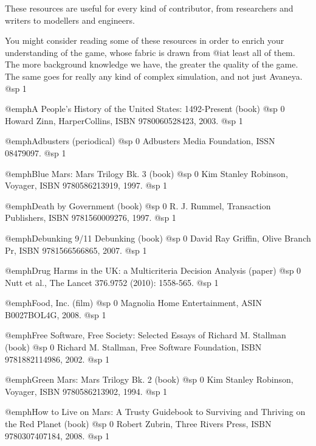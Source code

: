 These resources are useful for every kind of contributor, from researchers and writers to modellers and engineers.

You might consider reading some of these resources in order to enrich your understanding of the game, whose fabric is drawn from @i{at least} all of them. The more background knowledge we have, the greater the quality of the game. The same goes for really any kind of complex simulation, and not just Avaneya.
@sp 1

\itemize

\item
@emph{A People's History of the United States: 1492-Present} (book)
@sp 0
Howard Zinn, HarperCollins, ISBN 9780060528423, 2003.
@sp 1

\item
@emph{Adbusters} (periodical)
@sp 0
Adbusters Media Foundation, ISSN 08479097.
@sp 1

\item
@emph{Blue Mars: Mars Trilogy Bk. 3} (book)
@sp 0
Kim Stanley Robinson, Voyager, ISBN 9780586213919, 1997.
@sp 1

\item
@emph{Death by Government} (book)
@sp 0
R. J. Rummel, Transaction Publishers, ISBN 9781560009276, 1997.
@sp 1

\item
@emph{Debunking 9/11 Debunking} (book)
@sp 0
David Ray Griffin, Olive Branch Pr, ISBN 9781566566865, 2007.
@sp 1

\item
@emph{Drug Harms in the UK: a Multicriteria Decision Analysis} (paper)
@sp 0
Nutt et al., The Lancet 376.9752 (2010): 1558-565.
@sp 1

\item
@emph{Food, Inc.} (film)
@sp 0
Magnolia Home Entertainment, ASIN B0027BOL4G, 2008.
@sp 1

\item
@emph{Free Software, Free Society: Selected Essays of Richard M. Stallman} (book)
@sp 0
Richard M. Stallman, Free Software Foundation, ISBN 9781882114986, 2002.
@sp 1

\item
@emph{Green Mars: Mars Trilogy Bk. 2} (book)
@sp 0
Kim Stanley Robinson, Voyager, ISBN 9780586213902, 1994.
@sp 1

\item
@emph{How to Live on Mars: A Trusty Guidebook to Surviving and Thriving on the Red Planet} (book)
@sp 0
Robert Zubrin, Three Rivers Press, ISBN 9780307407184, 2008.
@sp 1

